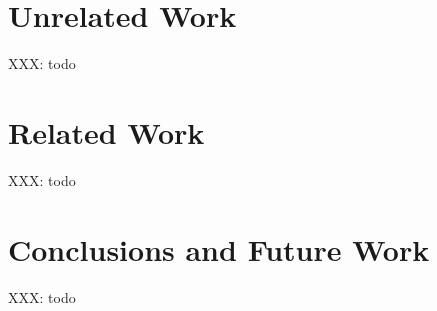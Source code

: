 \documentclass[preprint]{sigplanconf}
\begin{document}
\section{Unrelated Work}

XXX: todo


\section{Related Work}

XXX: todo


\section{Conclusions and Future Work}

XXX: todo








\end{document}
